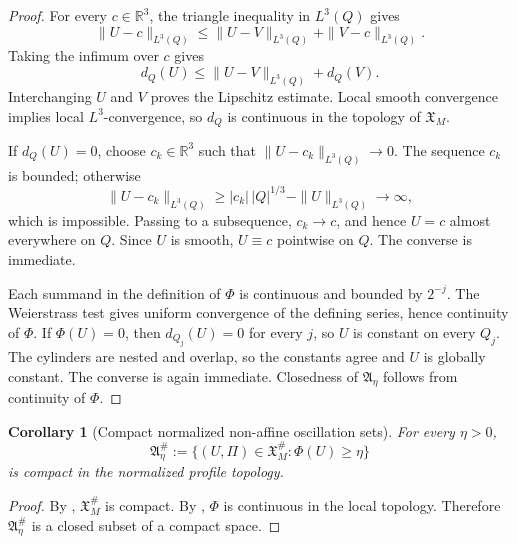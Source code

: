 \documentclass[11pt]{amsart}
\numberwithin{equation}{section}
\theoremstyle{plain}
\newtheorem{corollary}[corollary]{Corollary}
\theoremstyle{definition}
\theoremstyle{remark}
\begin{document}
\begin{proof}
For every \(c\in\mathbb R^3\), the triangle inequality in \(L^3(Q)\) gives
\[
   \|U-c\|_{L^3(Q)}
   \le
   \|U-V\|_{L^3(Q)}+\|V-c\|_{L^3(Q)}.
\]
Taking the infimum over \(c\) gives
\[
   d_Q(U)\le \|U-V\|_{L^3(Q)}+d_Q(V).
\]
Interchanging \(U\) and \(V\) proves the Lipschitz estimate.  Local smooth
convergence implies local \(L^3\)-convergence, so \(d_Q\) is continuous in the
topology of \(\mathfrak X_M\).

If \(d_Q(U)=0\), choose \(c_k\in\mathbb R^3\) such that
\(\|U-c_k\|_{L^3(Q)}\to0\).  The sequence \(c_k\) is bounded; otherwise
\[
   \|U-c_k\|_{L^3(Q)}
   \ge |c_k|\,|Q|^{1/3}-\|U\|_{L^3(Q)}
   \to\infty ,
\]
which is impossible.  Passing to a subsequence, \(c_k\to c\), and hence
\(U=c\) almost everywhere on \(Q\).  Since \(U\) is smooth, \(U\equiv c\)
pointwise on \(Q\).  The converse is immediate.

Each summand in the definition of \(\Phi\) is continuous and bounded by
\(2^{-j}\).  The Weierstrass test gives uniform convergence of the defining
series, hence continuity of \(\Phi\).  If \(\Phi(U)=0\), then
\(d_{Q_j}(U)=0\) for every \(j\), so \(U\) is constant on every \(Q_j\).  The
cylinders are nested and overlap, so the constants agree and \(U\) is globally
constant.  The converse is again immediate.  Closedness of
\(\mathfrak A_\eta\) follows from continuity of \(\Phi\).
\end{proof}

\begin{corollary}[Compact normalized non-affine oscillation sets]
\label{cor:compact-normalized-activity-set}
For every \(\eta>0\),
\[
   \mathfrak A_\eta^\#
   :=
   \{(U,\Pi)\in\mathfrak X_M^\#:\Phi(U)\ge\eta\}
\]
is compact in the normalized profile topology.
\end{corollary}

\begin{proof}
By , \(\mathfrak X_M^\#\) is compact.
By , \(\Phi\) is continuous in the local
topology.  Therefore \(\mathfrak A_\eta^\#\) is a closed subset of a compact
space.
\end{proof}
\end{document}
